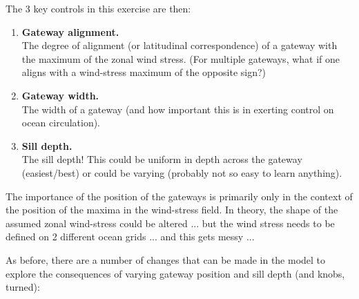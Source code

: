 \documentclass[11pt,fleqn]{book} %
\begin{document}
The 3 key controls in this exercise are then:

\vspace{2mm}
\begin{enumerate}
\vspace{1mm}
\item \textbf{Gateway alignment.}
\\The degree of alignment (or latitudinal correspondence) of a gateway with the maximum of the zonal wind stress. (For multiple gateways, what if one aligns with a wind-stress maximum of the opposite sign?)
\vspace{1mm}
\item \textbf{Gateway width.}
\\The width of a gateway (and how important this is in exerting control on ocean circulation).
\vspace{1mm}
\item \textbf{Sill depth.}
\\The sill depth! This could be uniform in depth across the gateway (easiest/best) or could be varying (probably not so easy to learn anything).
\end{enumerate}
\vspace{2mm}

The importance of the position of the gateways is primarily only in the context of the position of the maxima in the wind-stress field. In theory, the shape of the assumed zonal wind-stress could be altered ... but the wind stress needs to be defined on 2 different ocean grids  ... and this gets messy ...

As before, there are a number of changes that can be made in the model to explore the consequences of varying gateway position and sill depth (and knobs, turned):
\end{document}
